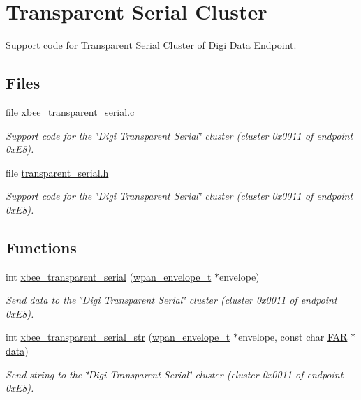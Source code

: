 \hypertarget{group__xbee__transparent}{\section{Transparent Serial Cluster}
\label{group__xbee__transparent}
}


Support code for Transparent Serial Cluster of Digi Data Endpoint.  


\subsection*{Files}
\begin{DoxyCompactItemize}
\item 
file \hyperlink{xbee__transparent__serial_8c}{xbee\-\_\-transparent\-\_\-serial.\-c}
\begin{DoxyCompactList}\small\item\em Support code for the \char`\"{}\-Digi Transparent Serial\char`\"{} cluster (cluster 0x0011 of endpoint 0x\-E8). \end{DoxyCompactList}\item 
file \hyperlink{transparent__serial_8h}{transparent\-\_\-serial.\-h}
\begin{DoxyCompactList}\small\item\em Support code for the \char`\"{}\-Digi Transparent Serial\char`\"{} cluster (cluster 0x0011 of endpoint 0x\-E8). \end{DoxyCompactList}\end{DoxyCompactItemize}
\subsection*{Functions}
\begin{DoxyCompactItemize}
\item 
int \hyperlink{group__xbee__transparent_gafbf9e5ccdb17be373012bd690a76e570}{xbee\-\_\-transparent\-\_\-serial} (\hyperlink{structwpan__envelope__t}{wpan\-\_\-envelope\-\_\-t} $\ast$envelope)
\begin{DoxyCompactList}\small\item\em Send data to the \char`\"{}\-Digi Transparent Serial\char`\"{} cluster (cluster 0x0011 of endpoint 0x\-E8). \end{DoxyCompactList}\item 
int \hyperlink{group__xbee__transparent_ga93c58cb71320437497c8aa9b3fca3f35}{xbee\-\_\-transparent\-\_\-serial\-\_\-str} (\hyperlink{structwpan__envelope__t}{wpan\-\_\-envelope\-\_\-t} $\ast$envelope, const char \hyperlink{group__hal_gaef060b3456fdcc093a7210a762d5f2ed}{F\-A\-R} $\ast$\hyperlink{group__xbee__io_gac5955aa1e44ff234e6d78a19cf68f25c}{data})
\begin{DoxyCompactList}\small\item\em Send string to the \char`\"{}\-Digi Transparent Serial\char`\"{} cluster (cluster 0x0011 of endpoint 0x\-E8). \end{DoxyCompactList}\end{DoxyCompactItemize}


